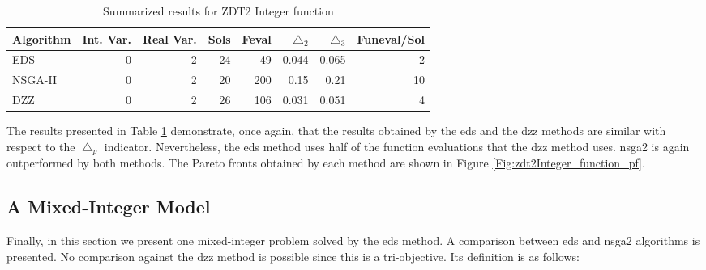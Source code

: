 \begin{table}[!htb]
\centering
\begin{tabular}{| l  r  r  r  r  r  r  r |}
	\hline
	Algorithm & Int. Var. & Real Var. & Sols & Feval & $\triangle_2$ & $\triangle_3$ & Funeval/Sol\\  
  	\hline
  	EDS & 0 & 2  & 24 & 49 & 0.044 & 0.065 & 2\\
  	NSGA-II & 0 & 2 & 20 & 200  & 0.15 & 0.21 & 10\\
  	DZZ & 0 & 2 & 26 & 106 & 0.031 & 0.051 & 4\\
  	\hline
\end{tabular}
\caption{Summarized results for ZDT2 Integer function}
\label{table:results_zdt2Integer_function}
\end{table}

The results presented in Table \ref{table:results_zdt2Integer_function} demonstrate, once again, that the results obtained by the \gls{eds} and the \gls{dzz} methods are similar with respect to the $\bigtriangleup_p$ indicator. Nevertheless, the \gls{eds} method uses half of the function evaluations that the \gls{dzz} method uses. \gls{nsga2} is again outperformed by both methods. The Pareto fronts obtained by each method are shown in Figure \ref{Fig:zdt2Integer_function_pf}.

\begin{comment}

\begin{figure}[H]
	\centering
	\hspace*{-0.5in}
    \subfloat[EDS]{%
      \texttt{[image: img/fronts/pf\_ijocCase2\_eds.png]}
    }
    \subfloat[NSGA-II]{%
      \texttt{[image: img/fronts/pf\_ijocCase2\_ga.png]}
    }
    \subfloat[DZZ]{%
      \texttt{[image: img/fronts/pf\_ijocCase2\_dzz.png]}
    }
    \caption{Pareto fronts of the ZDT2 Integer function computed by the different methods}
    \label{Fig:zdt2Integer_function_pf}
\end{figure}

\end{comment}

\subsection{A Mixed-Integer Model}

Finally, in this section we present one mixed-integer problem solved by the \gls{eds} method. A comparison between \gls{eds} and \gls{nsga2} algorithms is presented. No comparison against the \gls{dzz} method is possible since this is a tri-objective. Its definition is as follows:

